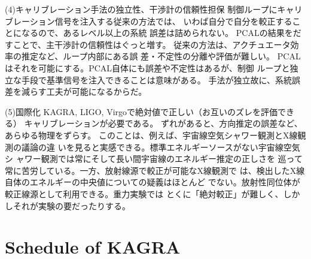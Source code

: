 (4)キャリブレーション手法の独立性、干渉計の信頼性担保
制御ループにキャリブレーション信号を注入する従来の方法では、
いわば自分で自分を較正することになるので、あるレベル以上の系統
誤差は詰められない。
PCALの結果をだすことで、主干渉計の信頼性はぐっと増す。
従来の方法は、アクチュエータ効率の推定など、ループ内部にある誤
差・不定性の分離や評価が難しい。
PCALはそれを可能にする。PCAL自体にも誤差や不定性はあるが、制御
ループと独立な手段で基準信号を注入できることは意味がある。
手法が独立故に、系統誤差を減らす工夫が可能になるからだ。

(5)国際化
KAGRA, LIGO, Virgoで絶対値で正しい（お互いのズレを評価できる）
キャリブレーションが必要である。
ずれがあると、方向推定の誤差など、あらゆる物理をずらす。
このことは、例えば、宇宙線空気シャワー観測とX線観測の議論の違
いを見ると実感できる。標準エネルギーソースがない宇宙線空気シ
ャワー観測では常にそして長い間宇宙線のエネルギー推定の正しさを
巡って常に苦労している。一方、放射線源で較正が可能なX線観測で
は、検出したX線自体のエネルギーの中央値についての疑義はほとんど
でない。放射性同位体が較正線源として利用できる。重力実験では
とくに「絶対較正」が難しく、しかしそれが実験の要だったりする。

\section{Schedule of KAGRA}



